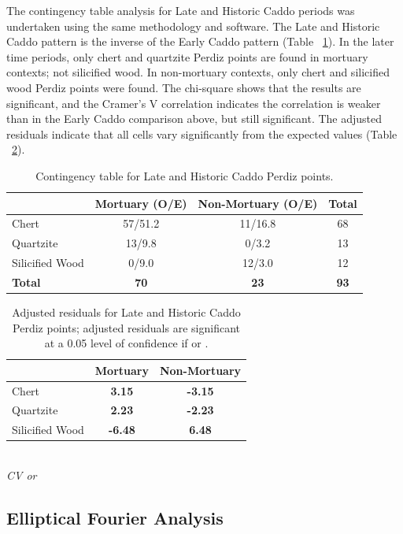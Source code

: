 \documentclass[review]{elsarticle}
\begin{document}
The contingency table analysis for Late and Historic Caddo periods was undertaken using the same methodology and software. The Late and Historic Caddo pattern is the inverse of the Early Caddo pattern (Table ~\ref{tab:Tbl3}). In the later time periods, only chert and quartzite Perdiz points are found in mortuary contexts; not silicified wood. In non-mortuary contexts, only chert and silicified wood Perdiz points were found. The chi-square shows that the results are significant, and the Cramer’s V correlation indicates the correlation is weaker than in the Early Caddo comparison above, but still significant. The adjusted residuals indicate that all cells vary significantly from the expected values (Table ~\ref{tab:Tbl4}).

\begin{table}[tbh]\centering
\footnotesize
\caption{Contingency table for Late and Historic Caddo Perdiz points.}
\centering
\begin{tabular}{lccc}
\hline
 & Mortuary (O/E) & Non-Mortuary (O/E) & Total\\
\hline
Chert & 57/51.2 & 11/16.8 & 68\\
Quartzite & 13/9.8 & 0/3.2 & 13\\
Silicified Wood & 0/9.0 & 12/3.0 & 12\\
\hline
\textbf{Total} & \textbf{70} & \textbf{23} & \textbf{93}\\
\hline
\end{tabular}
\label{tab:Tbl3}
\end{table}

\begin{table}[tbh]\centering
\footnotesize
\caption{Adjusted residuals for Late and Historic Caddo Perdiz points; adjusted residuals are significant at a 0.05 level of confidence if \textbf{} or \textbf{}.}
\centering
\begin{tabular}{lcc}
\hline
 & Mortuary & Non-Mortuary\\
\hline
Chert & \textbf{3.15} & \textbf{-3.15}\\
Quartzite & \textbf{2.23} & \textbf{-2.23}\\
Silicified Wood & \textbf{-6.48} & \textbf{6.48}\\
\hline
\end{tabular}\\
\textit{CV  or }
\label{tab:Tbl4}
\end{table}

\subsection*{Elliptical Fourier Analysis}
\end{document}

